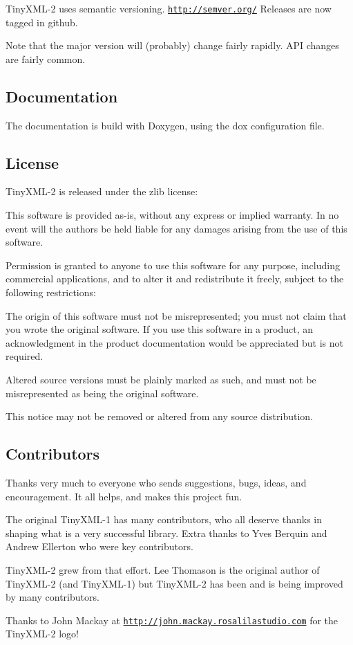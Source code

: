 Tiny\+X\+M\+L-\/2 uses semantic versioning. \href{http://semver.org/}{\tt http\+://semver.\+org/} Releases are now tagged in github.

Note that the major version will (probably) change fairly rapidly. A\+PI changes are fairly common.

\subsection*{Documentation }

The documentation is build with Doxygen, using the \textquotesingle{}dox\textquotesingle{} configuration file.

\subsection*{License }

Tiny\+X\+M\+L-\/2 is released under the zlib license\+:

This software is provided \textquotesingle{}as-\/is\textquotesingle{}, without any express or implied warranty. In no event will the authors be held liable for any damages arising from the use of this software.

Permission is granted to anyone to use this software for any purpose, including commercial applications, and to alter it and redistribute it freely, subject to the following restrictions\+:


\begin{DoxyEnumerate}
\item The origin of this software must not be misrepresented; you must not claim that you wrote the original software. If you use this software in a product, an acknowledgment in the product documentation would be appreciated but is not required.
\item Altered source versions must be plainly marked as such, and must not be misrepresented as being the original software.
\item This notice may not be removed or altered from any source distribution.
\end{DoxyEnumerate}

\subsection*{Contributors }

Thanks very much to everyone who sends suggestions, bugs, ideas, and encouragement. It all helps, and makes this project fun.

The original Tiny\+X\+M\+L-\/1 has many contributors, who all deserve thanks in shaping what is a very successful library. Extra thanks to Yves Berquin and Andrew Ellerton who were key contributors.

Tiny\+X\+M\+L-\/2 grew from that effort. Lee Thomason is the original author of Tiny\+X\+M\+L-\/2 (and Tiny\+X\+M\+L-\/1) but Tiny\+X\+M\+L-\/2 has been and is being improved by many contributors.

Thanks to John Mackay at \href{http://john.mackay.rosalilastudio.com}{\tt http\+://john.\+mackay.\+rosalilastudio.\+com} for the Tiny\+X\+M\+L-\/2 logo! 
